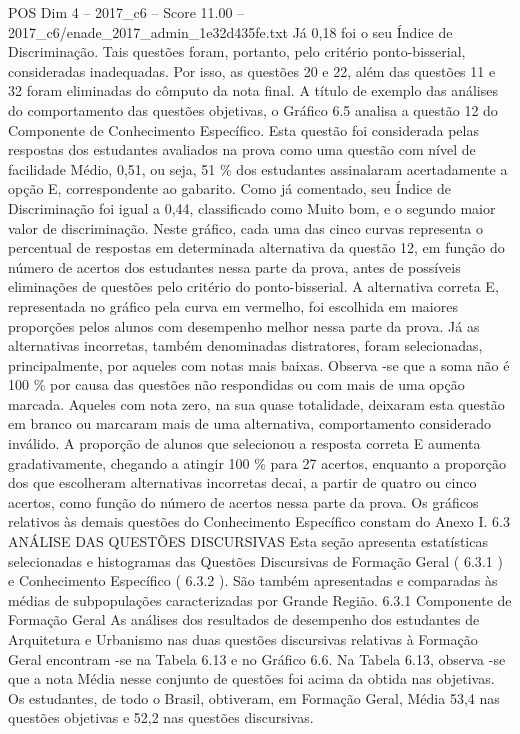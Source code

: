 \begin{textsample}{POS Dim 4 – 2017\_c6 – Score 11.00 – 2017\_c6/enade\_2017\_admin\_1e32d435fe.txt}
Já 0,18 foi o seu Índice de Discriminação.
Tais questões foram, portanto, pelo critério ponto-bisserial, consideradas inadequadas.
Por isso, as questões 20 e 22, além das questões 11 e 32 foram eliminadas do cômputo da nota final.
A título de exemplo das análises do comportamento das questões objetivas, o Gráfico 6.5 analisa a questão 12 do Componente de Conhecimento Específico.
Esta questão foi considerada pelas respostas dos estudantes avaliados na prova como uma questão com nível de facilidade Médio, 0,51, ou seja, 51 \% dos estudantes assinalaram acertadamente a opção E, correspondente ao gabarito.
Como já comentado, seu Índice de Discriminação foi igual a 0,44, classificado como Muito bom, e o segundo maior valor de discriminação.
Neste gráfico, cada uma das cinco curvas representa o percentual de respostas em determinada alternativa da questão 12, em função do número de acertos dos estudantes nessa parte da prova, antes de possíveis eliminações de questões pelo critério do ponto-bisserial.
A alternativa correta E, representada no gráfico pela curva em vermelho, foi escolhida em maiores proporções pelos alunos com desempenho melhor nessa parte da prova.
Já as alternativas incorretas, também denominadas distratores, foram selecionadas, principalmente, por aqueles com notas mais baixas.
Observa -se que a soma não é 100 \% por causa das questões não respondidas ou com mais de uma opção marcada.
Aqueles com nota zero, na sua quase totalidade, deixaram esta questão em branco ou marcaram mais de uma alternativa, comportamento considerado inválido.
A proporção de alunos que selecionou a resposta correta E aumenta gradativamente, chegando a atingir 100 \% para 27 acertos, enquanto a proporção dos que escolheram alternativas incorretas decai, a partir de quatro ou cinco acertos, como função do número de acertos nessa parte da prova.
Os gráficos relativos às demais questões do Conhecimento Específico constam do Anexo I. 6.3 ANÁLISE DAS QUESTÕES DISCURSIVAS Esta seção apresenta estatísticas selecionadas e histogramas das Questões Discursivas de Formação Geral ( 6.3.1 ) e Conhecimento Específico ( 6.3.2 ).
São também apresentadas e comparadas às médias de subpopulações caracterizadas por Grande Região. 6.3.1 Componente de Formação Geral As análises dos resultados de desempenho dos estudantes de Arquitetura e Urbanismo nas duas questões discursivas relativas à Formação Geral encontram -se na Tabela 6.13 e no Gráfico 6.6.
Na Tabela 6.13, observa -se que a nota Média nesse conjunto de questões foi acima da obtida nas objetivas.
Os estudantes, de todo o Brasil, obtiveram, em Formação Geral, Média 53,4 nas questões objetivas e 52,2 nas questões discursivas.

\end{textsample}

